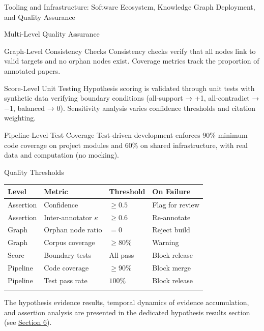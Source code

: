 \documentclass[
  ignorenonframetext,
]{beamer}
\newcounter{none} %
\begin{document}
\begin{frame}[fragile]{Tooling and Infrastructure: Software Ecosystem,
Knowledge Graph Deployment, and Quality Assurance \label{sec:tooling}}
\begin{block}{Multi-Level Quality Assurance}
\begin{block}{Graph-Level Consistency Checks}
\protect{}\label{graph-level-consistency-checks}
Consistency checks verify that all nodes link to valid targets and no
orphan nodes exist. Coverage metrics track the proportion of annotated
papers.
\end{block}

\begin{block}{Score-Level Unit Testing}
\protect{}\label{score-level-unit-testing}
Hypothesis scoring is validated through unit tests with synthetic data
verifying boundary conditions (all-support → +1, all-contradict → −1,
balanced → 0). Sensitivity analysis varies confidence thresholds and
citation weighting.
\end{block}

\begin{block}{Pipeline-Level Test Coverage}
\protect{}\label{pipeline-level-test-coverage}
Test-driven development enforces 90\% minimum code coverage on project
modules and 60\% on shared infrastructure, with real data and
computation (no mocking).
\end{block}

\begin{block}{Quality Thresholds}
\protect{}\label{quality-thresholds}
{\def\LTcaptype{none} %
\begin{longtable}[]{@{}llll@{}}
\toprule\noalign{}
Level & Metric & Threshold & On Failure \\
\midrule\noalign{}
\endhead
Assertion & Confidence & \(\geq 0.5\) & Flag for review \\
Assertion & Inter-annotator \(\kappa\) & \(\geq 0.6\) & Re-annotate \\
Graph & Orphan node ratio & \(= 0\) & Reject build \\
Graph & Corpus coverage & \(\geq 80\%\) & Warning \\
Score & Boundary tests & All pass & Block release \\
Pipeline & Code coverage & \(\geq 90\%\) & Block merge \\
Pipeline & Test pass rate & \(100\%\) & Block release \\
\bottomrule\noalign{}
\end{longtable}
}

The hypothesis evidence results, temporal dynamics of evidence
accumulation, and assertion analysis are presented in the dedicated
hypothesis results section (see
\hyperref[sec:hypothesis_results]{Section 6}).
\end{block}
\end{block}
\end{frame}
\end{document}
